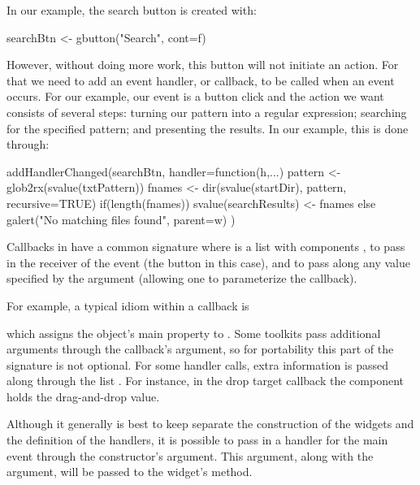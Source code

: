 In our example, the search button is created with:
\begin{Schunk}
\begin{Sinput}
 searchBtn <- gbutton("Search", cont=f)
\end{Sinput}
\end{Schunk}
%
However, without doing more work, this button will not initiate an
action. For that we need to add an event handler, or callback, to be
called when an event occurs. For our example, our event is a button
click and the action we want consists of several steps: turning our
pattern into a regular expression; searching for the specified
pattern; and presenting the results.  In our example, this is done
through:
\begin{Schunk}
\begin{Sinput}
 addHandlerChanged(searchBtn, handler=function(h,...) {
   pattern <- glob2rx(svalue(txtPattern))
   fnames <- dir(svalue(startDir), pattern, recursive=TRUE)
   if(length(fnames))
     svalue(searchResults) <- fnames
   else
     galert("No matching files found", parent=w)
 })
\end{Sinput}
\end{Schunk}
%
Callbacks in  have a common signature 
where  is a list with components , to pass in the
receiver of the event (the button in this case), and  to
pass along any value specified by the  argument (allowing
one to parameterize the callback).

For example, a typical idiom within a callback is
\begin{Schunk}
\end{Schunk}
%
which assigns the object's main property to . Some toolkits pass
additional arguments through the callback's   argument, so
for portability this part of the signature is not optional. For some
handler calls, extra information is passed along through the list
. For instance, in the drop target callback the component
 holds the drag-and-drop value.




Although it generally is best to keep separate the construction of the
widgets and the definition of the handlers, it is possible to pass in
a handler for the main event through the constructor's 
argument. This argument, along with the  argument, will
be passed to the widget's  method. 


